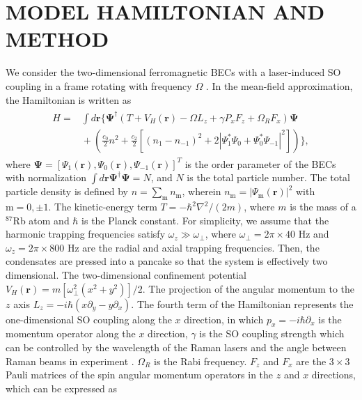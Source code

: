 \documentclass[aps,pra,showpacs,twocolumn,superscriptaddress]{revtex4-1}
\begin{document}
\section{MODEL HAMILTONIAN AND METHOD}
We consider the two-dimensional
ferromagnetic BECs with a laser-induced SO
coupling \cite{Lan2014,Gautam2015,Cheng2014,Salasnich2013,Kasamatsu2015,Zhang2013} in a frame rotating with frequency $\Omega$ \cite{Liu2012,Xu2011}.
In the mean-field approximation, the Hamiltonian is written
as \cite{Ji2008,Liu2012,Gautam2014,Martikainen2002,Mizushima2004}
\begin{eqnarray}
\begin{split}
H\!=\!&\int d\mathbf{r}\bigg\{\mathbf{\Psi}^\dagger\left(T\!+\!V_{H}(\mathbf{r})
\!-\!\Omega L_{z}
\!+\!\gamma P_{x}F_{z}\!+\!\Omega_{R}F_{x}\right)\mathbf{\Psi} \\
&\!+\!\left(\frac{c_{0}}{2}n^{2}\!+\!\frac{c_{2}}{2}[(n_{1}\!-\!n_{-1})^{2}
\!+\!2|\Psi^{\ast}_{1}\Psi_{0}\!+\!\Psi^{\ast}_{0}\Psi_{-1}|^{2}]\right)\bigg\},
\end{split}
\end{eqnarray}
where $\mathbf{\Psi} =[\Psi_{1}(\mathbf{r}),\Psi_{0}(\mathbf{r}),\Psi_{-1}(\mathbf{r})]^{T}$
is the order parameter of the BECs with normalization
$\int d\mathbf{r}\mathbf{\Psi}^{\dagger}\mathbf{\Psi}=N$, and $N$ is the
total particle number. The total particle density is defined by $n=\sum_{\mathrm{m}}n_{\mathrm{m}}$,
wherein $n_{\mathrm{m}}=|\Psi_{\mathrm{m}}(\mathbf{r})|^{2}$ with
$\mathrm{m}=0, \pm1$. The kinetic-energy term $T=-\hbar^{2}\nabla^{2}/(2m)$,
where $m$ is the mass of a $^{87}$Rb atom and $\hbar$ is the Planck constant.
For simplicity, we assume that the harmonic trapping
frequencies satisfy $\omega_{z}\gg\omega_{\bot}$, where $\omega_{\bot}=2\pi\times40$ Hz and $\omega_z=2\pi\times800$ Hz are
the radial and axial trapping frequencies.
Then, the condensates are
pressed into a pancake so that the system
is effectively two dimensional. The two-dimensional confinement potential
$V_{H}(\mathbf{r})=m[\omega^{2}_{\bot}(x^{2}+y^{2})]/2$.
The projection of the angular momentum to the $z$ axis $L_{z}=-i\hbar(x\partial_{y}-y\partial_{x})$.
The fourth term of the Hamiltonian represents the one-dimensional SO coupling along the
$x$ direction, in which $p_{x}=-i\hbar\partial_{x}$ is the momentum operator along the $x$
direction, $\gamma$ is the SO coupling strength which can be controlled by the wavelength of the Raman
lasers and the angle between Raman beams in experiment \cite{Lin2011}. $\Omega_{R}$ is the Rabi frequency. $F_{z}$
and $F_{x}$ are the $3\times3$ Pauli matrices of the spin angular momentum operators in the $z$ and $x$
directions, which can be expressed as
\end{document}
